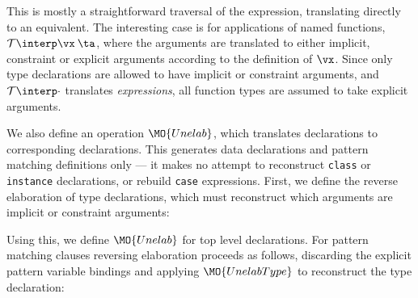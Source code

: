 \noindent
This is mostly a straightforward
traversal of the \TT{} expression, translating directly to an \Idris{} equivalent.
The interesting case is for applications of named functions,
$\uninterp{\vx\:\ta}$, where the arguments are translated to either implicit,
constraint or explicit arguments according to the definition of $\vx$.
Since only type declarations are allowed to have implicit or constraint arguments,
and $\uninterp{\cdot}$ translates \emph{expressions},
all function types are assumed to take explicit arguments.

We also define an operation $\MO{Unelab}$, which translates \TT{} declarations
to corresponding \Idris{} declarations. This generates data declarations and
pattern matching definitions only --- it makes no attempt to reconstruct 
\texttt{class}
or \texttt{instance} declarations, or rebuild \texttt{case} expressions.
First, we define the reverse elaboration of type declarations, which must reconstruct
which arguments are implicit or constraint arguments:


\noindent
Using this, we define $\MO{Unelab}$ for top level declarations. For pattern
matching clauses reversing elaboration proceeds as follows, discarding the explicit
pattern variable bindings and applying $\MO{UnelabType}$ to reconstruct
the type declaration:


